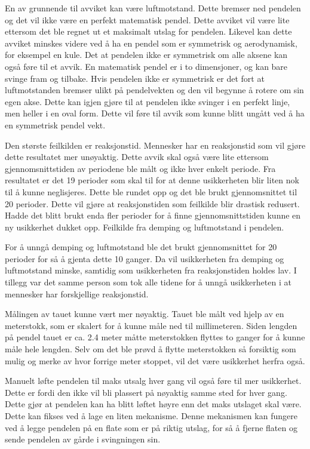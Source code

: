 \documentclass[twocolumn, 11pt]{article} %
\begin{document}
En av grunnende til avviket kan være luftmotstand. Dette bremser ned pendelen og det vil ikke være en perfekt matematisk pendel. Dette avviket vil være lite ettersom det ble regnet ut et maksimalt utslag for pendelen. Likevel kan dette avviket minskes videre ved å ha en pendel som er symmetrisk og aerodynamisk, for eksempel en kule. Det at pendelen ikke er symmetrisk om alle aksene kan også føre til et avvik. En matematisk pendel er i to dimensjoner, og kan bare svinge fram og tilbake. Hvis pendelen ikke er symmetrisk er det fort at luftmotstanden bremser ulikt på pendelvekten og den vil begynne å rotere om sin egen akse. Dette kan igjen gjøre til at pendelen ikke svinger i en perfekt linje, men heller i en oval form. Dette vil føre til avvik som kunne blitt ungått ved å ha en symmetrisk pendel vekt.

Den største feilkilden er reaksjonstid. Mennesker har en reaksjonstid som vil gjøre dette resultatet mer unøyaktig. Dette avvik skal også være lite ettersom gjennomsnittstiden av periodene ble målt og ikke hver enkelt periode.
Fra resultatet er det 19 perioder som skal til for at denne usikkerheten blir liten nok til å kunne neglisjeres. Dette ble rundet opp og det ble brukt gjennomsnittet til 20 perioder. Dette vil gjøre at reaksjonstiden som feilkilde blir drastisk redusert. Hadde det blitt brukt enda fler perioder for å finne gjennomsnittstiden kunne en ny usikkerhet dukket opp. Feilkilde fra demping og luftmotstand i pendelen. 

For å unngå demping og luftmotstand ble det brukt gjennomsnittet for 20 perioder for så å gjenta dette 10 ganger. Da vil usikkerheten fra demping og luftmotstand minske, samtidig som usikkerheten fra reaksjonstiden holdes lav. I tillegg var det samme person som tok alle tidene for å unngå usikkerheten i at mennesker har forskjellige reaksjonstid.

Målingen av tauet kunne vært mer nøyaktig. Tauet ble målt ved hjelp av en meterstokk, som er skalert for å kunne måle ned til millimeteren. Siden lengden på pendel tauet er ca. 2.4 meter måtte meterstokken flyttes to ganger for å kunne måle hele lengden. Selv om det ble prøvd å flytte meterstokken så forsiktig som mulig og merke av hvor forrige meter stoppet, vil det være usikkerhet herfra også.

Manuelt løfte pendelen til maks utsalg hver gang vil også føre til mer usikkerhet. Dette er fordi den ikke vil bli plassert på nøyaktig samme sted for hver gang. Dette gjør at pendelen kan ha blitt løftet høyre enn det maks utslaget skal være. Dette kan fikses ved å lage en liten mekanisme. Denne mekanismen kan fungere ved å legge pendelen på en flate som er på riktig utslag, for så å fjerne flaten og sende pendelen av gårde i svingningen sin.
\end{document}
